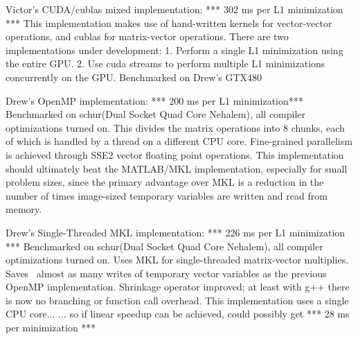 \documentclass[10pt,twocolumn,letterpaper]{article}
\begin{document}
Victor's CUDA/cublas mixed implementation: *** 302 ms per L1 minimization ***
This implementation makes use of hand-written kernels for vector-vector operations,
and cublas for matrix-vector operations.  There are two implementations under development:
1. Perform a single L1 minimization using the entire GPU.
2. Use cuda streams to perform multiple L1 minimizations concurrently on the GPU.
Benchmarked on Drew's GTX480

Drew's OpenMP implementation: *** 200 ms per L1 minimization***
Benchmarked on schur(Dual Socket Quad Core Nehalem), all compiler optimizations turned on.
This divides the matrix operations into 8 chunks, each of which is handled by a thread
on a different CPU core.  Fine-grained parallelism is achieved through SSE2 vector
floating point operations.  This implementation should ultimately beat the MATLAB/MKL
implementation, especially for small problem sizes, since the primary advantage
over MKL is a reduction in the number of times image-sized temporary variables
are written and read from memory. 

Drew's Single-Threaded MKL implementation: *** 226 ms per L1 minimization ***
Benchmarked on schur(Dual Socket Quad Core Nehalem), all compiler optimizations turned on.
Uses MKL for single-threaded matrix-vector multiplies.  
Saves ~almost as many writes of temporary vector variables as the previous OpenMP implementation.
Shrinkage operator improved; at least with g++ there is now no branching or function call overhead.
This implementation uses a single CPU core...
... so if linear speedup can be achieved, could possibly get *** 28 ms per minimization ***
\end{document}
